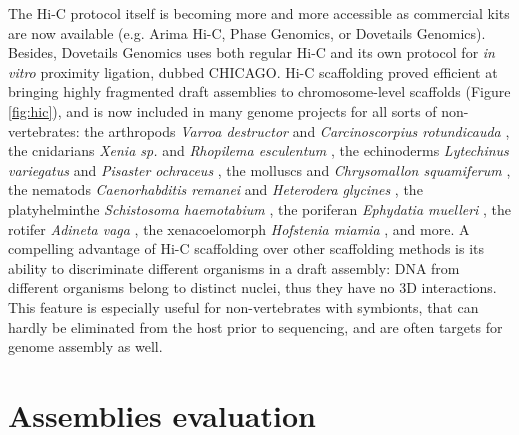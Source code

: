The Hi-C protocol itself is becoming more and more accessible as commercial kits are now available (e.g. Arima Hi-C, Phase Genomics, or Dovetails Genomics). Besides, Dovetails Genomics uses both regular Hi-C and its own protocol for \textit{in vitro} proximity ligation, dubbed CHICAGO. Hi-C scaffolding proved efficient at bringing highly fragmented draft assemblies to chromosome-level scaffolds (Figure \ref{fig:hic}), and is now included in many genome projects for all sorts of non-vertebrates: the arthropods \textit{Varroa destructor} \cite{varroa_destructor} and \textit{Carcinoscorpius rotundicauda} \cite{carcinoscorpius_rotundicauda2}, the cnidarians \textit{Xenia sp.} \cite{xenia_sp} and \textit{Rhopilema esculentum} \cite{rhopilema_esculentum}, the echinoderms \textit{Lytechinus variegatus} \cite{lytechinus_variegatus} and \textit{Pisaster ochraceus} \cite{pisaster_ochraceus}, the molluscs \cite{scapharca_broughtonii} and \textit{Chrysomallon squamiferum} \cite{chrysomallon_squamiferum}, the nematods \textit{Caenorhabditis remanei} \cite{caenorhabditis_remanei2} and \textit{Heterodera glycines} \cite{heterodera_glycines2}, the platyhelminthe \textit{Schistosoma haemotabium} \cite{schistosoma_haematobium}, the poriferan \textit{Ephydatia muelleri} \cite{ephydatia_mulleri}, the rotifer \textit{Adineta vaga} \cite{adineta_vaga2}, the xenacoelomorph \textit{Hofstenia miamia} \cite{hofstenia_miamia}, and more. A compelling advantage of Hi-C scaffolding over other scaffolding methods is its ability to discriminate different organisms in a draft assembly: DNA from different organisms belong to distinct nuclei, thus they have no 3D interactions. This feature is especially useful for non-vertebrates with symbionts, that can hardly be eliminated from the host prior to sequencing, and are often targets for genome assembly as well. \\

\section{Assemblies evaluation}

